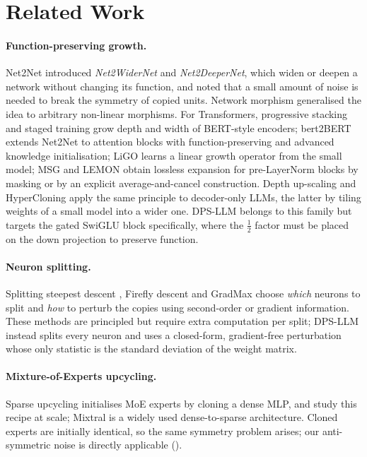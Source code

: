 \section{Related Work}
\paragraph{Function-preserving growth.}
Net2Net \citep{chen2015net2net} introduced \emph{Net2WiderNet} and \emph{Net2DeeperNet}, which widen or deepen a network without changing its function, and noted that a small amount of noise is needed to break the symmetry of copied units. Network morphism \citep{wei2016morphism} generalised the idea to arbitrary non-linear morphisms.
For Transformers, progressive stacking \citep{gong2019stacking} and staged training \citep{shen2022staged} grow depth and width of BERT-style encoders; bert2BERT \citep{chen2022bert2bert} extends Net2Net to attention blocks with function-preserving and advanced knowledge initialisation; LiGO \citep{wang2023ligo} learns a linear growth operator from the small model; MSG \citep{yao2024msg} and LEMON \citep{wang2024lemon} obtain lossless expansion for pre-LayerNorm blocks by masking or by an explicit average-and-cancel construction.
Depth up-scaling \citep{kim2024solar} and HyperCloning \citep{samragh2024hypercloning} apply the same principle to decoder-only LLMs, the latter by tiling weights of a small model into a wider one.
DPS-LLM belongs to this family but targets the gated SwiGLU block specifically, where the $\tfrac{1}{2}$ factor must be placed on the down projection to preserve function.

\paragraph{Neuron splitting.}
Splitting steepest descent \citep{liu2019splitting}, Firefly descent \citep{wu2020firefly} and GradMax \citep{evci2022gradmax} choose \emph{which} neurons to split and \emph{how} to perturb the copies using second-order or gradient information. These methods are principled but require extra computation per split; DPS-LLM instead splits every neuron and uses a closed-form, gradient-free perturbation whose only statistic is the standard deviation of the weight matrix.

\paragraph{Mixture-of-Experts upcycling.}
Sparse upcycling \citep{komatsuzaki2022sparse} initialises MoE experts \citep{shazeer2017outrageously,lepikhin2021gshard,fedus2022switch} by cloning a dense MLP, and \citet{he2024upcycling} study this recipe at scale; Mixtral \citep{jiang2024mixtral} is a widely used dense-to-sparse architecture. Cloned experts are initially identical, so the same symmetry problem arises; our anti-symmetric noise is directly applicable ().

